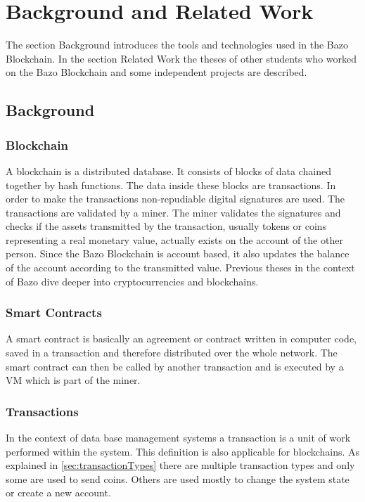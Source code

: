 \chapter{Background and Related Work}
\thispagestyle{main} %

The section Background introduces the tools and technologies used in the Bazo Blockchain. In the section Related Work the theses of other students who worked on the Bazo Blockchain and some independent projects are described.

\section{Background}
\subsection{Blockchain}
A blockchain is a distributed database. It consists of blocks of data chained together by hash functions. The data inside these blocks are transactions. In order to make the transactions non-repudiable digital signatures are used. The transactions are validated by a miner. The miner validates the signatures and checks if the assets transmitted by the transaction, usually tokens or coins representing a real monetary value, actually exists on the account of the other person. Since the Bazo Blockchain is account based, it also updates the balance of the account according to the transmitted value. Previous theses in the context of Bazo dive deeper into cryptocurrencies and blockchains. \cite{ba_miner} \cite{ba_client} 

\subsection{Smart Contracts}
A smart contract is basically an agreement or contract written in computer code, saved in a transaction and therefore distributed over the whole network. The smart contract can then be called by another transaction and is executed by a VM which is part of the miner.

\subsection{Transactions}
In the context of data base management systems a transaction is a unit of work performed within the system. \cite{dbtransaction} This definition is also applicable for blockchains. As explained in \autoref{sec:transactionTypes} there are multiple transaction types and only some are used to send coins. Others are used mostly to change the system state or create a new account.

